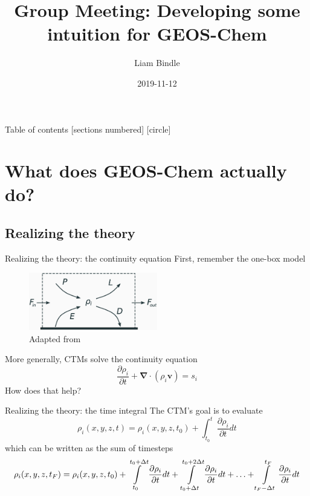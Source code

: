 \documentclass[10pt]{beamer}
\title{Group Meeting: Developing some intuition for GEOS-Chem}
\date{2019-11-12}
\author{Liam Bindle}
\begin{document}
\maketitle

\begin{frame}{Table of contents}
  [sections numbered]
  [circle]
  \tableofcontents
\end{frame}

\section{What does GEOS-Chem actually do?}
\subsection{Realizing the theory}

\begin{frame}[fragile]{Realizing the theory: the continuity equation}
    First, remember the one-box model
    \begin{figure}
        \centering
        \includegraphics[width=0.5\textwidth]{box-model.eps}
        \captionsetup{labelformat=empty}
        \caption{Adapted from \cite{jacob_introduction_1999}}
    \end{figure}
    \pause
    More generally, CTMs solve the continuity equation
    $$
        \frac{\partial \rho_i}{\partial t} + \boldsymbol \nabla \cdot (\rho_i \boldsymbol v) = s_i
    $$
    \pause
    How does that help?
\end{frame}

\begin{frame}[fragile]{Realizing the theory: the time integral}
    The CTM's goal is to evaluate
    $$
        \rho_i(x, y, z, t) = \rho_i(x, y, z, t_0) + \int_{t_0}^{t} \frac{\partial \rho_i}{\partial t} dt
    $$
    \pause
    \vfill
    which can be written as the sum of timesteps
    \small
    $$
        \rho_i(x, y, z, t_F) = \rho_i(x, y, z, t_0) + \int\displaylimits_{t_0}^{t_0 + \Delta t} \frac{\partial \rho_i}{\partial t} dt  + \int\displaylimits_{t_0 + \Delta t}^{t_0 + 2 \Delta t} \frac{\partial \rho_i}{\partial t} dt + \ldots + \int\displaylimits_{t_F - \Delta t}^{t_F} \frac{\partial \rho_i}{\partial t} dt
    $$
\end{frame}
\end{document}
